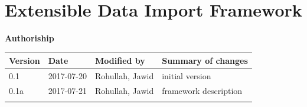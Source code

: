 \section{Extensible Data Import
Framework}\label{extensible-data-import-framework}

\textbf{Authoriship}

\begin{longtable}[]{@{}llll@{}}
\toprule
\begin{minipage}[b]{0.10\columnwidth}\raggedright\strut
Version\strut
\end{minipage} & \begin{minipage}[b]{0.06\columnwidth}\raggedright\strut
Date\strut
\end{minipage} & \begin{minipage}[b]{0.15\columnwidth}\raggedright\strut
Modified by\strut
\end{minipage} & \begin{minipage}[b]{0.23\columnwidth}\raggedright\strut
Summary of changes\strut
\end{minipage}\tabularnewline
\midrule
\endhead
\begin{minipage}[t]{0.10\columnwidth}\raggedright\strut
0.1\strut
\end{minipage} & \begin{minipage}[t]{0.06\columnwidth}\raggedright\strut
2017-07-20\strut
\end{minipage} & \begin{minipage}[t]{0.15\columnwidth}\raggedright\strut
Rohullah, Jawid\strut
\end{minipage} & \begin{minipage}[t]{0.23\columnwidth}\raggedright\strut
initial version\strut
\end{minipage}\tabularnewline
\begin{minipage}[t]{0.10\columnwidth}\raggedright\strut
0.1a\strut
\end{minipage} & \begin{minipage}[t]{0.06\columnwidth}\raggedright\strut
2017-07-21\strut
\end{minipage} & \begin{minipage}[t]{0.15\columnwidth}\raggedright\strut
Rohullah, Jawid\strut
\end{minipage} & \begin{minipage}[t]{0.23\columnwidth}\raggedright\strut
framework description\strut
\end{minipage}\tabularnewline
\begin{minipage}[t]{0.10\columnwidth}\raggedright\strut

\end{minipage}
\end{longtable}
